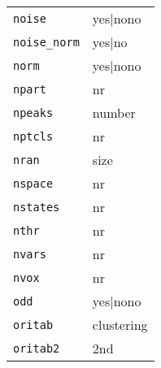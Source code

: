 \begin{tabular}{ll}
\texttt{noise}&{yes|no{no}}\\
\texttt{noise\_norm}&{yes|no}\\
\texttt{norm}&{yes|no{no}}\\
\texttt{npart}&{nr}\\
\texttt{npeaks}&{number}\\
\texttt{nptcls}&{nr}\\
\texttt{nran}&{size}\\
\texttt{nspace}&{nr}\\
\texttt{nstates}&{nr}\\
\texttt{nthr}&{nr}\\
\texttt{nvars}&{nr}\\
\texttt{nvox}&{nr}\\
\texttt{odd}&{yes|no{no}}\\
\texttt{oritab}&{clustering}\\
\texttt{oritab2}&{2nd}\\
\end{tabular}

